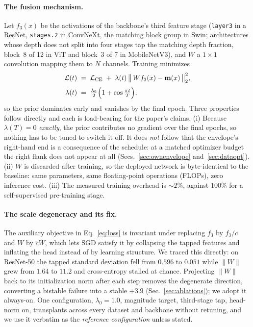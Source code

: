 \paragraph{The fusion mechanism.} Let $f_3(x)$ be the activations of the
backbone's third feature stage (\texttt{layer3} in a ResNet, \texttt{stages.2}
in ConvNeXt, the matching block group in Swin; architectures whose depth does
not split into four stages tap the matching depth fraction, block~8 of 12 in
ViT and block~3 of 7 in MobileNetV3), and $W$ a $1{\times}1$ convolution mapping them to $N$
channels. Training minimizes
\begin{equation}
  \begin{aligned}
    \mathcal{L}(t) &\;=\; \mathcal{L}_{\mathrm{CE}}
      \;+\; \lambda(t)\,
      \bigl\lVert\, W f_3(x) - \mathbf{m}(x) \,\bigr\rVert_2^2,\\[2pt]
    \lambda(t) &\;=\; \tfrac{\lambda_0}{2}
      \Bigl(1+\cos\tfrac{\pi t}{T}\Bigr),
  \end{aligned}
  \label{eq:loss}
\end{equation}
so the prior dominates early and vanishes by the final epoch. Three properties
follow directly and each is load-bearing for the paper's claims. (i) Because
$\lambda(T)=0$ \emph{exactly}, the prior contributes no gradient over the final
epochs, so nothing has to be tuned to switch it off. It does \emph{not} follow
that the envelope's right-hand end is a consequence of the schedule: at a
matched optimizer budget the right flank does not appear at all
(Secs.~\ref{sec:ownenvelope} and~\ref{sec:dataopt}). (ii) $W$ is discarded after training, so the deployed network is
byte-identical to the baseline: same parameters, same floating-point operations
(FLOPs), zero inference cost. (iii) The measured training overhead is
${\sim}2\%$, against $100\%$ for a self-supervised pre-training stage.

\paragraph{The scale degeneracy and its fix.} The auxiliary objective in
Eq.~\ref{eq:loss} is invariant under replacing $f_3$ by $f_3/c$ and $W$ by
$cW$, which lets SGD satisfy it by collapsing the tapped features and inflating
the head instead of by learning structure. We traced this directly: on
ResNet-50 the tapped standard deviation fell from $0.596$ to $0.051$ while
$\lVert W\rVert$ grew from $1.64$ to $11.2$ and cross-entropy stalled at
chance. Projecting $\lVert W \rVert$ back to its initialization norm after each
step removes the degenerate direction, converting a bistable failure into a
stable $+3.9$ (Sec.~\ref{sec:ablations}); we adopt it always-on. One
configuration, $\lambda_0{=}1.0$, magnitude target, third-stage tap, head-norm
on, transplants across every dataset and backbone without retuning, and we use
it verbatim as the \emph{reference configuration} unless stated.

